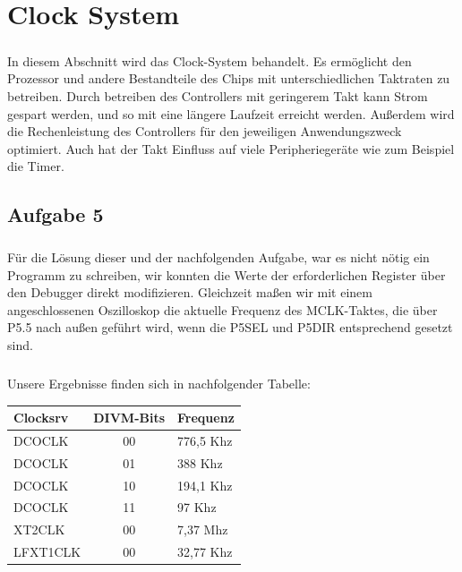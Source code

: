 \chapter{Clock System}

\paragraph*{}
In diesem Abschnitt wird das Clock-System behandelt. Es ermöglicht den Prozessor und andere Bestandteile des Chips mit unterschiedlichen Taktraten zu betreiben. Durch betreiben des Controllers mit geringerem Takt kann Strom gespart werden, und so mit eine längere Laufzeit erreicht werden. Außerdem wird die Rechenleistung des Controllers für den jeweiligen Anwendungszweck optimiert. Auch hat der Takt Einfluss auf viele Peripheriegeräte wie zum Beispiel die Timer.

\section*{Aufgabe 5}

\paragraph*{}
Für die Lösung dieser und der nachfolgenden Aufgabe, war es nicht nötig ein Programm zu schreiben, wir konnten die Werte der erforderlichen Register über den Debugger direkt modifizieren. Gleichzeit maßen wir mit einem angeschlossenen Oszilloskop die aktuelle Frequenz des MCLK-Taktes, die über P5.5 nach außen geführt wird, wenn die P5SEL und P5DIR entsprechend gesetzt sind.

\paragraph*{}
Unsere Ergebnisse finden sich in nachfolgender Tabelle: \\

\begin{tabular}{ p{4cm} | c | p{4cm} }\hline \hline
Clocksrv & DIVM-Bits & Frequenz \\ \hline
DCOCLK & 00 & 776,5 Khz \\ \cline{2-3}
DCOCLK & 01 & 388 Khz \\ \cline{2-3}
DCOCLK & 10 & 194,1 Khz \\ \cline{2-3}
DCOCLK & 11 & 97 Khz \\ \hline
XT2CLK & 00 & 7,37 Mhz \\ \hline
LFXT1CLK & 00 & 32,77 Khz \\ \hline
\end{tabular}


